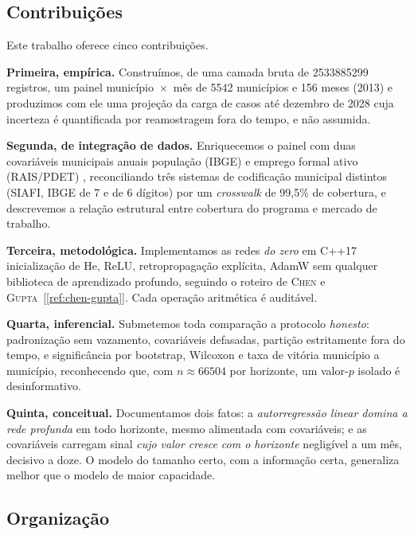 \documentclass[12pt,a4paper,oneside]{article}
\newcommand{\C}[1]{[\ref{#1}]}
\begin{document}
\subsection{Contribuições}

Este trabalho oferece cinco contribuições.

\textbf{Primeira, empírica.} Construímos, de uma camada bruta de
\num{2533885299} registros, um painel município~$\times$~mês de
\num{5542} municípios e 156 meses (2013) e produzimos com
ele uma projeção da carga de casos até dezembro de 2028 cuja incerteza é
quantificada por reamostragem fora do tempo, e não assumida.

\textbf{Segunda, de integração de dados.} Enriquecemos o painel com duas
covariáveis municipais anuais \textemdash{} população (IBGE) e emprego
formal ativo (RAIS/PDET) \textemdash{}, reconciliando três sistemas de
codificação municipal distintos (SIAFI, IBGE de 7 e de 6 dígitos) por um
\emph{crosswalk} de 99,5\% de cobertura, e descrevemos a relação
estrutural entre cobertura do programa e mercado de trabalho.

\textbf{Terceira, metodológica.} Implementamos as redes \emph{do zero} em
C++17 \textemdash{} inicialização de He, ReLU, retropropagação explícita,
AdamW \textemdash{} sem qualquer biblioteca de aprendizado profundo,
seguindo o roteiro de \textsc{Chen} e \textsc{Gupta}~\C{ref:chen-gupta}.
Cada operação aritmética é auditável.

\textbf{Quarta, inferencial.} Submetemos toda comparação a protocolo
\emph{honesto}: padronização sem vazamento, covariáveis defasadas,
partição estritamente fora do tempo, e significância por bootstrap,
Wilcoxon e taxa de vitória município a município, reconhecendo que, com
$n\approx\num{66504}$ por horizonte, um valor-$p$ isolado é
desinformativo.

\textbf{Quinta, conceitual.} Documentamos dois fatos: a \emph{autorregressão
linear domina a rede profunda} em todo horizonte, mesmo alimentada com
covariáveis; e as covariáveis carregam sinal \emph{cujo valor cresce com o
horizonte} \textemdash{} negligível a um mês, decisivo a doze. O modelo do
tamanho certo, com a informação certa, generaliza melhor que o modelo de
maior capacidade.

\subsection{Organização}
\end{document}

